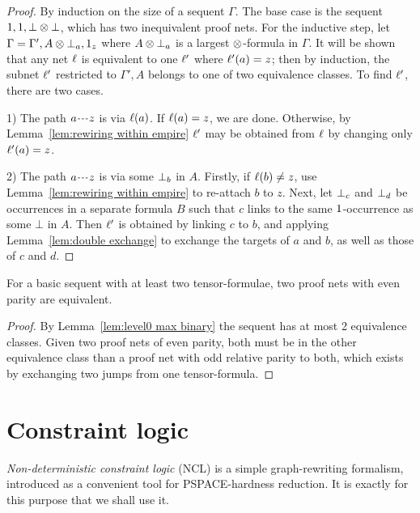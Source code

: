 \documentclass{lmcs}
\let\capsabbrev=\uppercase
\begin{document}
\begin{proof}
By induction on the size of a sequent $\Gamma$. The base case is the sequent $1,1,\bot\otimes\bot$, which has two inequivalent proof nets. For the inductive step, let $\Gamma=\Gamma',A\otimes\bot_{a},1_{z}$ where $A\otimes\bot_{a}$ is a largest $\otimes$-formula in $\Gamma$. It will be shown that any net $\ell$ is equivalent to one $\ell'$ where $\ell'(a)=z$; then by induction, the subnet $\ell'$ restricted to $\Gamma',A$ belongs to one of two equivalence classes. To find $\ell'$, there are two cases.

1) The path $\path az$ is via $\ell(a)$. If $\ell(a)=z$, we are done. Otherwise, by Lemma~\ref{lem:rewiring within empire} $\ell'$ may be obtained from $\ell$ by changing only $\ell'(a)=z$.

2) The path $\path az$ is via some $\bot_{b}$ in $A$. Firstly, if $\ell(b)\neq z$, use Lemma~\ref{lem:rewiring within empire} to re-attach $b$ to $z$. Next, let $\bot_{c}$ and $\bot_{d}$ be occurrences in a separate formula $B$ such that $c$ links to the same $1$-occurrence as some $\bot$ in $A$. Then $\ell'$ is obtained by linking $c$ to $b$, and applying Lemma~\ref{lem:double exchange} to exchange the targets of $a$ and $b$, as well as those of $c$ and $d$.
\end{proof}


\begin{proposition}
\label{prop:parity determines equivalence}
For a basic sequent with at least two tensor-formulae, two proof nets with even parity are equivalent.
\end{proposition}

\begin{proof}
By Lemma~\ref{lem:level0 max binary} the sequent has at most 2 equivalence classes. Given two proof nets of even parity, both must be in the other equivalence class than a proof net with odd relative parity to both, which exists by exchanging two jumps from one tensor-formula.
\end{proof}




\section{Constraint logic}
\label{sec:ncl}


\emph{Non-deterministic constraint logic} (NCL) \cite{Hearn-Demaine-2005,Demaine-Hearn-2008,GamesPuzzlesAndComputation} is a simple graph-rewriting formalism, introduced as a convenient tool for \capsabbrev{pspace}-hardness reduction. It is exactly for this purpose that we shall use it.
\end{document}
